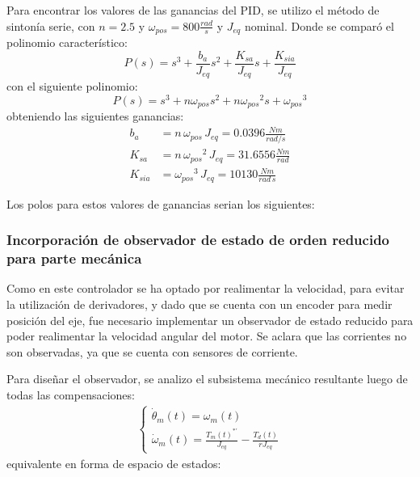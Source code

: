 \documentclass[a4paper, 10pt, onecolumn,journal]{ieeeconf}
\begin{document}
Para encontrar los valores de las ganancias del PID, se utilizo el método de sintonía serie, con $n=2.5$ y $\omega_{pos}=800\frac{rad}{s}$ y $J_{eq}$ nominal. Donde se comparó el polinomio característico:
\begin{equation}
	P(s) =  s^3 + \frac{b_a}{J_{eq}} s^2 + \frac{K_{sa}}{J_{eq}} s + \frac{K_{sia}}{J_{eq}} 
\end{equation}
con el siguiente polinomio:
\begin{equation}
	P(s) =  s^3 + n \omega_{pos} s^2 + n {\omega_{pos}}^2 s + {\omega_{pos}}^3 
\end{equation}
obteniendo las siguientes ganancias:
\begin{align}
	b_a &=  n \, \omega_{pos} \, J_{eq}= 0.0396 \frac{Nm}{rad/s} \\
	K_{sa} &=  n \, {\omega_{pos}}^2 \, J_{eq}= 31.6556 \frac{Nm}{rad}\\
	K_{sia} &= {\omega_{pos}}^3 \, J_{eq}= 10130 \frac{Nm}{rad \, s}
\end{align}

Los polos para estos valores de ganancias serian los siguientes:

\subsubsection{\textbf{Incorporación de observador de estado de orden reducido para parte mecánica}}
Como en este controlador se ha optado por realimentar la velocidad, para evitar la utilización de derivadores, y dado que se cuenta con un encoder para medir posición del eje, fue necesario implementar un observador de estado reducido para poder realimentar la velocidad angular del motor. Se aclara que las corrientes no son observadas, ya que se cuenta con sensores de corriente.

Para diseñar el observador, se analizo el subsistema mecánico resultante luego de todas las compensaciones:
\begin{align}
	\begin{cases}
		\dot{\theta}_m(t) ={\omega}_m(t)\\
		\dot{\omega}_m(t) = \frac{{T_m(t)}^{*'}}{ J_{eq}}- \frac{T_d(t)}{r J_{eq}}
	\end{cases}\label{ecuacion de subsistema mecanico compensado}
\end{align}
 equivalente en forma de espacio de estados:
 
\end{document}
